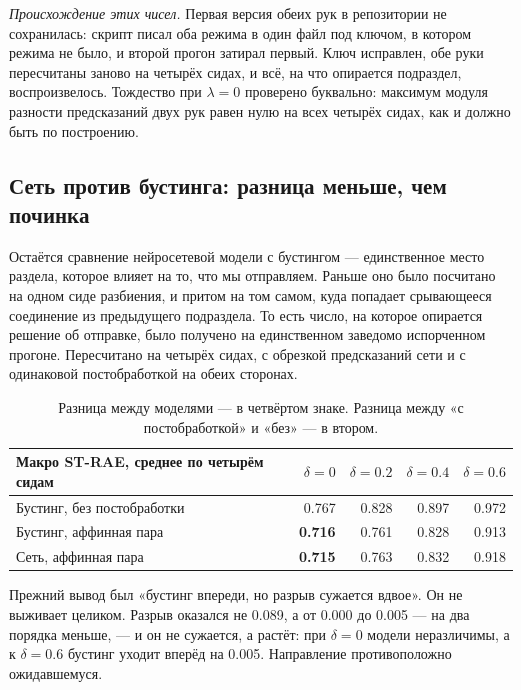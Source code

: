 \emph{Происхождение этих чисел.} Первая версия обеих рук в репозитории не сохранилась:
скрипт писал оба режима в один файл под ключом, в котором режима не было, и второй прогон
затирал первый. Ключ исправлен, обе руки пересчитаны заново на четырёх сидах, и всё, на что
опирается подраздел, воспроизвелось. Тождество при $\lambda = 0$ проверено буквально:
максимум модуля разности предсказаний двух рук равен нулю на всех четырёх сидах, как и
должно быть по построению.

\subsection{Сеть против бустинга: разница меньше, чем починка}

Остаётся сравнение нейросетевой модели с бустингом --- единственное место раздела, которое
влияет на то, что мы отправляем. Раньше оно было посчитано на одном сиде разбиения, и притом
на том самом, куда попадает срывающееся соединение из предыдущего подраздела. То есть число,
на которое опирается решение об отправке, было получено на единственном заведомо испорченном
прогоне. Пересчитано на четырёх сидах, с обрезкой предсказаний сети и с одинаковой
постобработкой на обеих сторонах.

\begin{table}[htbp]\centering\small
\begin{tabularx}{\textwidth}{@{}Xrrrr@{}}
\toprule
Макро ST-RAE, среднее по четырём сидам & $\delta = 0$ & $\delta = 0.2$ & $\delta = 0.4$ & $\delta = 0.6$ \\
\midrule
Бустинг, без постобработки        & 0.767 & 0.828 & 0.897 & 0.972 \\
Бустинг, аффинная пара            & \textbf{0.716} & 0.761 & 0.828 & 0.913 \\
Сеть, аффинная пара               & \textbf{0.715} & 0.763 & 0.832 & 0.918 \\
\bottomrule
\end{tabularx}
\caption{Разница между моделями --- в четвёртом знаке. Разница между «с постобработкой» и
«без» --- в втором.}
\label{tab:vsboost}
\end{table}

Прежний вывод был «бустинг впереди, но разрыв сужается вдвое». Он не выживает целиком.
Разрыв оказался не 0.089, а от 0.000 до 0.005 --- на два порядка меньше, --- и он не
сужается, а растёт: при $\delta = 0$ модели неразличимы, а к $\delta = 0.6$ бустинг уходит
вперёд на 0.005. Направление противоположно ожидавшемуся.

